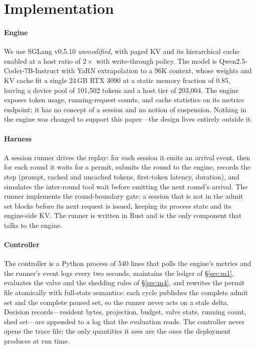 \section{Implementation}
\label{sec:impl}

\paragraph{Engine} We use SGLang v0.5.10 \cite{zheng2024sglang} \emph{unmodified}, with
paged KV \cite{kwon2023pagedattention} and its hierarchical cache enabled at a host ratio
of $2\times$ with write-through policy. The model is Qwen2.5-Coder-7B-Instruct with YaRN
extrapolation to a 96K context, whose weights and KV cache fit a single 24\,GB RTX 3090 at
a static memory fraction of 0.85, leaving a device pool of 101,502 tokens and a host tier
of 203,004. The engine exposes token usage, running-request counts, and cache statistics on
its metrics endpoint; it has no concept of a session and no notion of suspension. Nothing
in the engine was changed to support this paper---the design lives entirely outside it.

\paragraph{Harness} A session runner drives the replay: for each session it emits an
arrival event, then for each round it waits for a permit, submits the round to the engine,
records the step (prompt, cached and uncached tokens, first-token latency, duration), and
simulates the inter-round tool wait before emitting the next round's arrival. The runner
implements the round-boundary gate: a session that is not in the admit set blocks before
its next request is issued, keeping its process state and its engine-side KV. The runner is
written in Rust and is the only component that talks to the engine.

\paragraph{Controller} The controller is a Python process of 540 lines that polls
the engine's metrics and the runner's event logs every two seconds, maintains the ledger of
\S\ref{sec:m1}, evaluates the valve and the shedding rules of \S\ref{sec:m4}, and rewrites
the permit file atomically with full-state semantics: each cycle publishes the complete
admit set and the complete paused set, so the runner never acts on a stale delta. Decision
records---resident bytes, projection, budget, valve state, running count, shed set---are
appended to a log that the evaluation reads. The controller never opens the trace file: the
only quantities it sees are the ones the deployment produces at run time.

